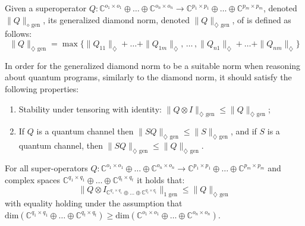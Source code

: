 \begin{definition} \label{def:gen_diamond_norm}
Given a superoperator $Q: \mathbb{C}^{o_1 \times o_1} \oplus \ldots \oplus \mathbb{C}^{o_n \times o_n}  \rightarrow \mathbb{C}^{p_1 \times p_1} \oplus \ldots \oplus  \mathbb{C}^{p_m \times p_m} $, denoted $\|Q\|_{\diamond \text{ gen}}$, its generalized diamond norm, denoted $\|Q\|_{\diamondsuit \text{ gen}}$, of is defined as follows:
\begin{equation}
    \|Q\|_{\diamondsuit \text{ gen}} = \max \{\|Q_{11}\|_{\diamondsuit} + \ldots + \|Q_{1m}\|_{\diamondsuit}, \hspace{2pt} \ldots \hspace{2pt}, \|Q_{n1}\|_{\diamondsuit} + \ldots + \|Q_{nm}\|_{\diamondsuit} \}
\end{equation}
\end{definition}

In order for the generalized diamond norm to be a suitable norm when reasoning about quantum programs, similarly to the diamond norm, it should satisfy the following properties:
\begin{enumerate}
  \item Stability under tensoring with identity: $\|Q \otimes I\|_{\diamondsuit \text{ gen}} \leq \|Q\|_{\diamondsuit \text{ gen}}$;
  \item If $Q$ is a quantum channel then $\lVert S  Q \rVert_{\diamondsuit \text{ gen}} \leq \lVert S \rVert_{\diamondsuit \text{ gen}}$, and if $S$ is a quantum channel, then $\lVert S  Q \rVert_{\diamondsuit \text{ gen}} \leq \lVert Q \rVert_{\diamondsuit \text{ gen}}$.
\end{enumerate}


  \begin{theorem} \label{theorem:tensor_stability} 
For all super-operators $Q: \mathbb{C}^{o_1 \times o_1} \oplus \ldots \oplus \mathbb{C}^{o_n \times o_n}  \rightarrow \mathbb{C}^{p_1 \times p_1} \oplus \ldots \oplus  \mathbb{C}^{p_m \times p_m}$ and complex spaces $\mathbb{C}^{q_1 \times q_1} \oplus \ldots \oplus \mathbb{C}^{q_t \times q_t}$  it holds that:
    \begin{equation}
      \lVert Q \otimes I_{\mathbb{C}^{q_1 \times q_1} \oplus \ldots \oplus \mathbb{C}^{q_t \times q_t}} \rVert_{1 \text{ gen}} \leq  \lVert Q \rVert_{\diamondsuit \text{ gen}}
    \end{equation}
    with equality holding under the assumption that $\text{dim}(\mathbb{C}^{q_1 \times q_1} \oplus \ldots \oplus \mathbb{C}^{q_t \times q_t}) \geq  \text{dim}(\mathbb{C}^{o_1 \times o_1} \oplus \ldots \oplus \mathbb{C}^{o_n \times o_n})$.
    \end{theorem}


